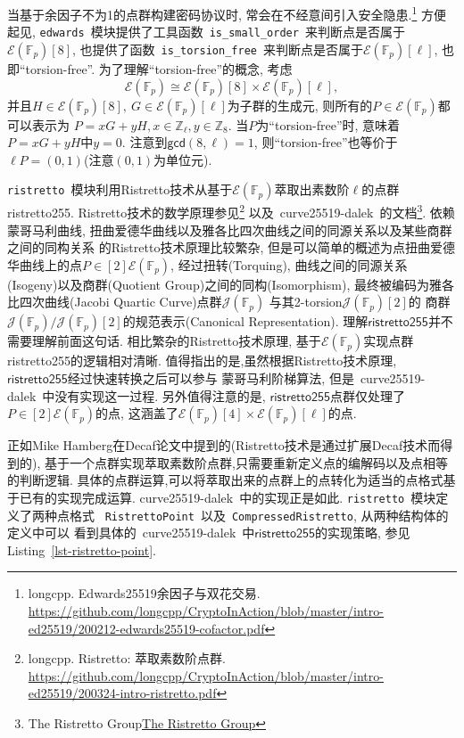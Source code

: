\documentclass{article}
\newcommand{\Z}{\mathbb{Z}}
\newcommand{\F}{\mathbb{F}}
\newcommand{\code}[1]{\lstinline!#1!}
\begin{document}
当基于余因子不为1的点群构建密码协议时, 常会在不经意间引入安全隐患.\footnote{
longcpp. Edwards25519余因子与双花交易.
\url{https://github.com/longcpp/CryptoInAction/blob/master/intro-ed25519/200212-edwards25519-cofactor.pdf}}
方便起见, \code{edwards}~模块提供了工具函数~\code{is_small_order}~来判断点是否属于$\mathcal{E}(\F_p) [8]$,
也提供了函数~\code{is_torsion_free}~来判断点是否属于$ \mathcal{E}(\F_p)[\ell]$, 也即``torsion-free''.
为了理解``torsion-free''的概念, 考虑
$$\mathcal{E}(\F_p) \cong \mathcal{E}(\F_p) [8] \times \mathcal{E}(\F_p)[\ell],$$
并且$H \in  \mathcal{E}(\F_p) [8],\ G\in \mathcal{E}(\F_p)[\ell]$为子群的生成元,
则所有的$P \in \mathcal{E}(\F_p)$都可以表示为 $P = xG + yH, x\in \Z_\ell, y\in\Z_8$.
当$P$为``torsion-free''时, 意味着$P= xG+ yH$中$y = 0$. 
注意到$\textsf{gcd}(8,\ell) = 1$, 则``torsion-free''也等价于$\ell P = (0,1)$(注意$(0,1)$为单位元).

\code{ristretto}~模块利用Ristretto技术从基于$\mathcal{E}(\F_p)$萃取出素数阶$\ell$的点群\textsf{ristretto255}.
Ristretto技术的数学原理参见\footnote{longcpp. Ristretto: 萃取素数阶点群.
\url{https://github.com/longcpp/CryptoInAction/blob/master/intro-ed25519/200324-intro-ristretto.pdf}}
以及~\textsf{curve25519-dalek}~的文档\footnote{
The Ristretto Group\url{The Ristretto Group}}.
依赖蒙哥马利曲线, 扭曲爱德华曲线以及雅各比四次曲线之间的同源关系以及某些商群之间的同构关系
的Ristretto技术原理比较繁杂, 但是可以简单的概述为点扭曲爱德华曲线上的点$P\in [2]\mathcal{E}(\F_p)$,
经过扭转(Torquing), 曲线之间的同源关系(Isogeny)以及商群(Quotient Group)之间的同构(Isomorphism),
最终被编码为雅各比四次曲线(Jacobi Quartic Curve)点群$\mathcal{J}(\F_p)$
与其2-torsion$\mathcal{J}(\F_p)[2]$的
商群$\mathcal{J}(\F_p)/\mathcal{J}(\F_p)[2]$的规范表示(Canonical Representation).
理解$\textsf{ristretto255}$并不需要理解前面这句话.
相比繁杂的Ristretto技术原理, 基于$\mathcal{E}(\F_p)$实现点群\textsf{ristretto255}的逻辑相对清晰.
值得指出的是,虽然根据Ristretto技术原理, $\textsf{ristretto255}$经过快速转换之后可以参与
蒙哥马利阶梯算法, 但是~\textsf{curve25519-dalek}~中没有实现这一过程.
另外值得注意的是, $\textsf{ristretto255}$点群仅处理了$P\in [2]\mathcal{E}(\F_p)$的点,
这涵盖了$\mathcal{E}(\F_p)[4]\times\mathcal{E}(\F_p)[\ell]$的点.

正如Mike Hamberg在Decaf论文中提到的(Ristretto技术是通过扩展Decaf技术而得到的),
基于一个点群实现萃取素数阶点群,只需要重新定义点的编解码以及点相等的判断逻辑.
具体的点群运算,可以将萃取出来的点群上的点转化为适当的点格式基于已有的实现完成运算.
\textsf{curve25519-dalek}~中的实现正是如此. \code{ristretto}~模块定义了两种点格式
~\code{RistrettoPoint}~以及~\code{CompressedRistretto}, 从两种结构体的定义中可以
看到具体的~\textsf{curve25519-dalek}~中$\textsf{ristretto255}$的实现策略,
参见Listing~\ref{lst-ristretto-point}.
\end{document}
